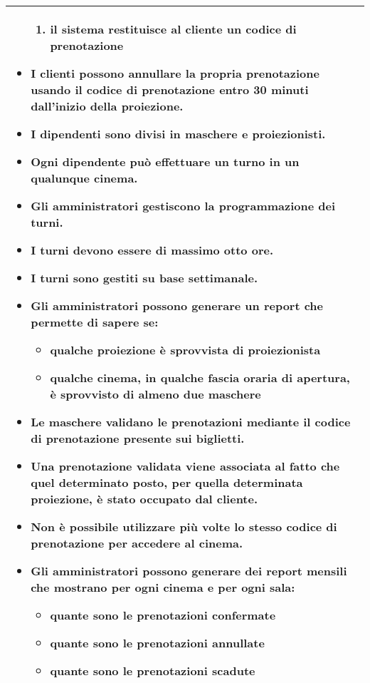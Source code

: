 \begin{tabularx}{\linewidth}{|X|}
\begin{itemize}
\begin{enumerate}
                  \item il sistema restituisce al cliente un codice di
                        prenotazione
              \end{enumerate}
        \item I clienti possono annullare la propria prenotazione usando il
              codice di prenotazione entro 30 minuti dall'inizio della
              proiezione.
        \item I dipendenti sono divisi in maschere e proiezionisti.
        \item Ogni dipendente può effettuare un turno in un qualunque cinema.
        \item Gli amministratori gestiscono la programmazione dei turni.
        \item I turni devono essere di massimo otto ore.
        \item I turni sono gestiti su base settimanale.
        \item Gli amministratori possono generare un report che permette di
              sapere se:
              \begin{itemize}
                  \item qualche proiezione è sprovvista di proiezionista
                  \item qualche cinema, in qualche fascia oraria di apertura,
                        è sprovvisto di almeno due maschere
              \end{itemize}
        \item Le maschere validano le prenotazioni mediante il codice
              di prenotazione presente sui biglietti.
        \item Una prenotazione validata viene associata al fatto che quel
              determinato posto, per quella determinata proiezione,
              è stato occupato dal cliente.
        \item Non è possibile utilizzare più volte lo stesso codice di
              prenotazione per accedere al cinema.
        \item Gli amministratori possono generare dei report mensili che
              mostrano per ogni cinema e per ogni sala:
              \begin{itemize}
                  \item quante sono le prenotazioni confermate
                  \item quante sono le prenotazioni annullate
                  \item quante sono le prenotazioni scadute
              \end{itemize}
    \end{itemize}
    \\\hline
\end{tabularx}

